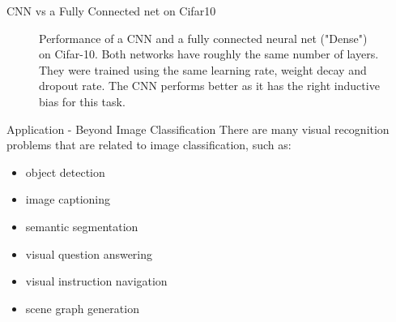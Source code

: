\begin{frame} {CNN vs a Fully Connected net on Cifar10}
  \begin{figure}
        \centering
        \caption{Performance of a CNN and a fully connected neural net ("Dense") on Cifar-10. Both networks have roughly the same number of layers. They were trained using the same learning rate, weight decay and dropout rate. The CNN performs better as it has the right inductive bias for this task.}
    \end{figure} 
\end{frame}
\begin{vbframe}{Application - Beyond Image Classification}
There are many visual recognition problems that are related to image classification, such as:

\begin{itemize}
    \item object detection
    \item image captioning
    \item semantic segmentation
    \item visual question answering
    \item visual instruction navigation
    \item scene graph generation
\end{itemize}
\end{vbframe}


